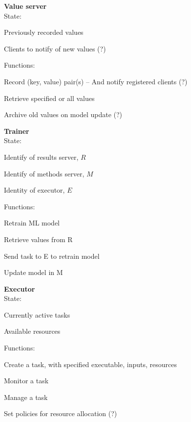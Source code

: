 \documentclass[10pt]{article}
\begin{document}
\vspace{3ex}

\noindent
\textbf{Value server}\\
State:
\begin{compactitem}
\item
Previously recorded values
\item
Clients to notify of new values (?)
\end{compactitem}
Functions:
\begin{compactitem}
\item
Record (key, value) pair(s) -- And notify registered clients (?)
\item
Retrieve specified or all values
\item
Archive old values on model update (?)
\end{compactitem}

\vspace{3ex}

\noindent
\textbf{Trainer}\\
State:
\begin{compactitem}
\item
Identify of results server, $R$
\item
Identify of methods server, $M$
\item
Identity of executor, $E$
\end{compactitem}
Functions:
\begin{compactitem}
\item
Retrain ML model
\item
Retrieve values from R
\item
Send task to E to retrain model 
\item
Update model in M
\end{compactitem}


\vspace{3ex}

\noindent
\textbf{Executor}\\
State:
\begin{compactitem}
\item
Currently active tasks
\item
Available resources
\end{compactitem}
Functions:
\begin{compactitem}
\item
Create a task, with specified executable, inputs, resources
\item
Monitor a task
\item
Manage a task
\item
Set policies for resource allocation (?)
\end{compactitem}
\end{document}
